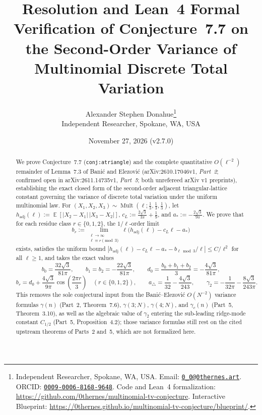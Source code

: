 \documentclass[11pt,a4paper]{article}
\title{\Large\bfseries Resolution and Lean~4 Formal Verification of Conjecture~7.7 on the Second-Order Variance of Multinomial Discrete Total Variation}
\author{
  Alexander Stephen Donahue\thanks{Independent Researcher, Spokane, WA, USA. Email: \href{mailto:0_0@0thernes.art}{\texttt{0\_0@0thernes.art}}. ORCID: \href{https://orcid.org/0009-0006-8168-9648}{\texttt{0009-0006-8168-9648}}. Code and Lean~4 formalization: \url{https://github.com/0thernes/multinomial-tv-conjecture}. Interactive Blueprint: \url{https://0thernes.github.io/multinomial-tv-conjecture/blueprint/}.}\\[0.35em]
  \normalsize Independent Researcher, Spokane, WA, USA
}
\date{November 27, 2026 (v2.7.0)}
\numberwithin{equation}{section}
\theoremstyle{plain}
\theoremstyle{definition}
\theoremstyle{remark}
\DeclareMathOperator{\E}{\mathbb{E}}
\DeclareMathOperator{\Mult}{Mult}
\newcommand{\hadj}{h_{\mathrm{adj}}}
\newcommand{\tri}{a_{\triangle}}
\begin{document}
\maketitle

\begin{abstract}
We prove Conjecture~7.7 (\texttt{conj:atriangle}) and the complete quantitative $O(\ell^{-2})$ remainder of Lemma~7.3 of Bani\'c and Elezovi\'c (arXiv:2610.17046v1, \emph{Part~2}; confirmed open in arXiv:2611.14735v1, \emph{Part~5}; both unrefereed arXiv v1 preprints), establishing the exact closed form of the second-order adjacent triangular-lattice constant governing the variance of discrete total variation under the uniform multinomial law. For $(X_1,X_2,X_3)\sim\Mult(\ell;\tfrac{1}{3},\tfrac{1}{3},\tfrac{1}{3})$, let $\hadj(\ell):=\E[|X_2-X_1|\,|X_3-X_2|]$, $c_L:=\frac{2\sqrt{3}}{3\pi}+\frac{1}{9}$, and $a_*:=-\frac{2\sqrt{3}}{9\pi}$. We prove that for each residue class $r\in\{0,1,2\}$, the $1/\ell$-order limit
\[
  b_r := \lim_{\substack{\ell\to\infty\\\ell\equiv r\pmod 3}} \ell\bigl(\hadj(\ell)-c_L\ell-a_*\bigr)
\]
exists, satisfies the uniform bound $|\hadj(\ell)-c_L\ell-a_*-b_{\ell\bmod 3}/\ell|\le C/\ell^2$ for all $\ell\ge 1$, and takes the exact values
\[
  b_0 = \frac{32\sqrt{3}}{81\pi}, \qquad
  b_1 = b_2 = -\frac{22\sqrt{3}}{81\pi}, \qquad
  d_0 = \frac{b_0+b_1+b_2}{3} = -\frac{4\sqrt{3}}{81\pi},
\]
\[
  b_r = d_0 + \frac{4\sqrt{3}}{9\pi}\cos\!\left(\frac{2\pi r}{3}\right)\quad (r\in\{0,1,2\}), \qquad
  \tri = \frac{1}{32} - \frac{4\sqrt{3}}{243}, \qquad
  \gamma_2 = -\frac{1}{32\pi} - \frac{8\sqrt{3}}{243\pi}.
\]
This removes the sole conjectural input from the Bani\'c--Elezovi\'c $O(N^{-2})$ variance formulas $\gamma(n)$ (Part~2, Theorem~7.6), $\gamma(3;N)$, $\gamma(4;N)$, and $\gamma_c(n)$ (Part~5, Theorem~3.10), as well as the algebraic value of $\gamma_2$ entering the sub-leading ridge-mode constant $C_{1/2}$ (Part~5, Proposition~4.2); those variance formulas still rest on the cited upstream theorems of Parts~2 and~5, which are not formalized here.


\end{abstract}
\end{document}

